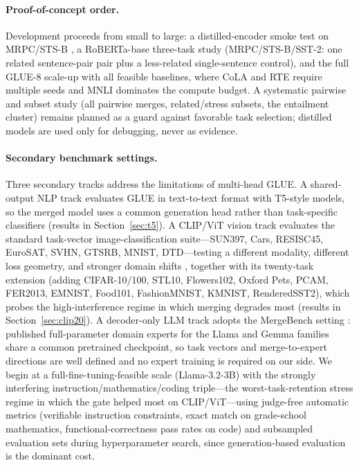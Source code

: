 \documentclass[11pt]{article}
\begin{document}
\paragraph{Proof-of-concept order.}
Development proceeds from small to large: a distilled-encoder smoke test on MRPC/STS-B \citep{sanh2019distilbert}, a RoBERTa-base three-task study (MRPC/STS-B/SST-2: one related sentence-pair pair plus a less-related single-sentence control), and the full GLUE-8 scale-up with all feasible baselines, where CoLA and RTE require multiple seeds and MNLI dominates the compute budget. A systematic pairwise and subset study (all pairwise merges, related/stress subsets, the entailment cluster) remains planned as a guard against favorable task selection; distilled models are used only for debugging, never as evidence.

\paragraph{Secondary benchmark settings.}
Three secondary tracks address the limitations of multi-head GLUE. A shared-output NLP track evaluates GLUE in text-to-text format with T5-style models, so the merged model uses a common generation head rather than task-specific classifiers \citep{wang2019superglue,raffel2020t5} (results in Section~\ref{sec:t5}). A CLIP/ViT vision track evaluates the standard task-vector image-classification suite---SUN397, Cars, RESISC45, EuroSAT, SVHN, GTSRB, MNIST, DTD---testing a different modality, different loss geometry, and stronger domain shifts \citep{radford2021clip,ilharco2022taskarithmetic,tang2024fusionbench}, together with its twenty-task extension \citep{wang2024tall} (adding CIFAR-10/100, STL10, Flowers102, Oxford Pets, PCAM, FER2013, EMNIST, Food101, FashionMNIST, KMNIST, RenderedSST2), which probes the high-interference regime in which merging degrades most (results in Section~\ref{sec:clip20}). A decoder-only LLM track adopts the MergeBench setting \citep{he2025mergebench}: published full-parameter domain experts for the Llama and Gemma families share a common pretrained checkpoint, so task vectors and merge-to-expert directions are well defined and no expert training is required on our side. We begin at a full-fine-tuning-feasible scale (Llama-3.2-3B) with the strongly interfering instruction/mathematics/coding triple---the worst-task-retention stress regime in which the gate helped most on CLIP/ViT---using judge-free automatic metrics (verifiable instruction constraints, exact match on grade-school mathematics, functional-correctness pass rates on code) and subsampled evaluation sets during hyperparameter search, since generation-based evaluation is the dominant cost.
\end{document}

